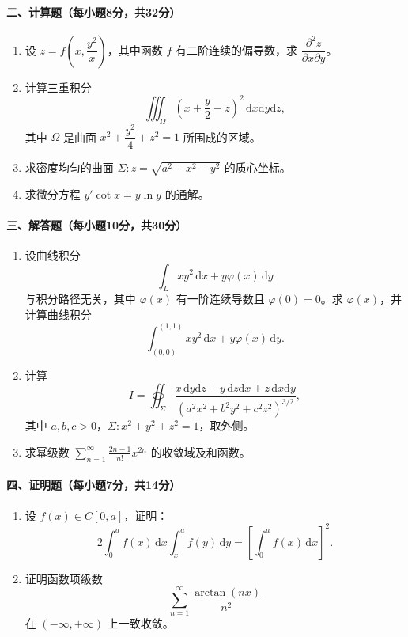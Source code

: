\paragraph*{二、计算题（每小题8分，共32分）}
\begin{enumerate}
  \item 设 \(z=f\left(x,\dfrac{y^2}{x}\right)\)，其中函数 \(f\) 有二阶连续的偏导数，求
  \(\dfrac{\partial^2 z}{\partial x\partial y}\)。

  \item 计算三重积分
  \[
    \iiint_\Omega \left(x+\frac y2-z\right)^2\,\mathrm{d}x\mathrm{d}y\mathrm{d}z,
  \]
  其中 \(\Omega\) 是曲面 \(x^2+\dfrac{y^2}{4}+z^2=1\) 所围成的区域。

  \item 求密度均匀的曲面 \(\Sigma:z=\sqrt{a^2-x^2-y^2}\) 的质心坐标。

  \item 求微分方程 \(y'\cot x=y\ln y\) 的通解。
\end{enumerate}

\paragraph*{三、解答题（每小题10分，共30分）}
\begin{enumerate}
  \item 设曲线积分
  \[
    \int_L xy^2\,\mathrm{d}x+y\varphi(x)\,\mathrm{d}y
  \]
  与积分路径无关，其中 \(\varphi(x)\) 有一阶连续导数且 \(\varphi(0)=0\)。求 \(\varphi(x)\)，并计算曲线积分
  \[
    \int_{(0,0)}^{(1,1)}xy^2\,\mathrm{d}x+y\varphi(x)\,\mathrm{d}y.
  \]

  \item 计算
  \[
    I=\oiint_\Sigma
    \frac{x\,\mathrm{d}y\mathrm{d}z+y\,\mathrm{d}z\mathrm{d}x+z\,\mathrm{d}x\mathrm{d}y}
    {(a^2x^2+b^2y^2+c^2z^2)^{3/2}},
  \]
  其中 \(a,b,c>0\)，\(\Sigma:x^2+y^2+z^2=1\)，取外侧。

  \item 求幂级数 \(\displaystyle \sum_{n=1}^{\infty}\frac{2n-1}{n!}x^{2n}\) 的收敛域及和函数。
\end{enumerate}

\paragraph*{四、证明题（每小题7分，共14分）}
\begin{enumerate}
  \item 设 \(f(x)\in C[0,a]\)，证明：
  \[
    2\int_0^a f(x)\,\mathrm{d}x\int_x^a f(y)\,\mathrm{d}y
    =\left[\int_0^a f(x)\,\mathrm{d}x\right]^2.
  \]
  \item 证明函数项级数
  \[
    \sum_{n=1}^{\infty}\frac{\arctan(nx)}{n^2}
  \]
  在 \((-\infty,+\infty)\) 上一致收敛。
\end{enumerate}

